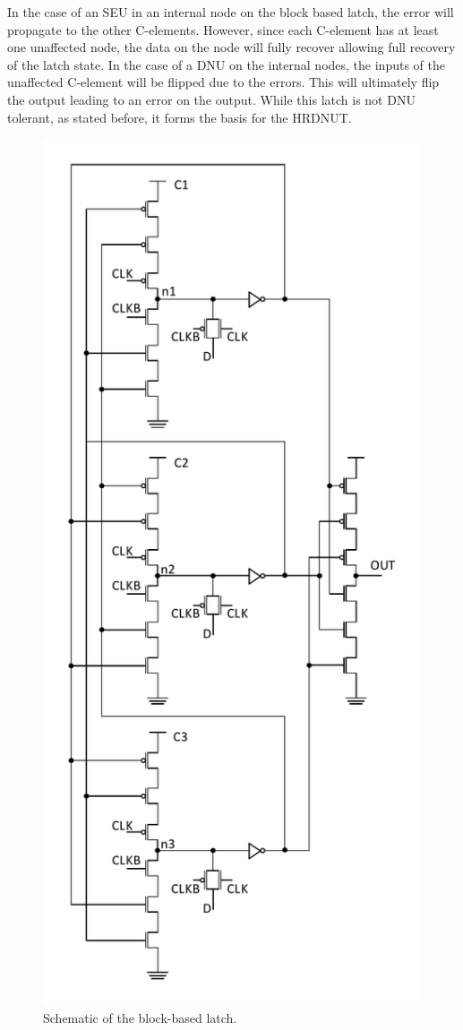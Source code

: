 In the case of an SEU in an internal node on the block based latch, the error will propagate to the other C-elements. However, since each C-element has at least one unaffected node, the data on the node will fully recover allowing full recovery of the latch state. In the case of a DNU on the internal nodes, the inputs of the unaffected C-element will be flipped due to the errors. This will ultimately flip the output leading to an error on the output. While this latch is not DNU tolerant, as stated before, it forms the basis for the HRDNUT.

\begin{figure}[!htbp]
	\centering
	\includegraphics[width=0.55\linewidth]{Figures/BLatch}
	\caption{Schematic of the block-based latch.}
	\label{BLatch}
\end{figure} 

